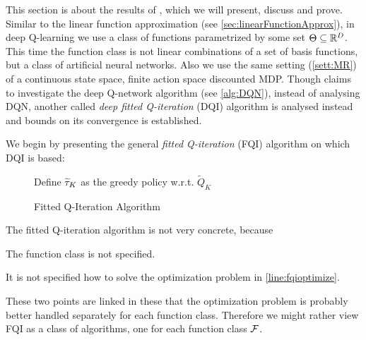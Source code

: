 This section is about the results of ,
which we will present, discuss and prove.
Similar to the linear function approximation
(see \cref{sec:linearFunctionApprox}), in deep Q-learning
we use a class of functions parametrized by some set $\Theta \subseteq \mathbb{R}^D$.
This time the function class is not linear combinations of a set of
basis functions, but a class of artificial neural networks.
Also we use the same setting (\cref{sett:MR}) of a
continuous state space, finite action space discounted MDP.
Though  claims to investigate the deep Q-network algorithm
(see \cref{alg:DQN}),
instead of analysing DQN,
another called \emph{deep fitted Q-iteration} (DQI) algorithm is
analysed instead and bounds on its convergence is established.

We begin by presenting the general \emph{fitted Q-iteration} (FQI) algorithm
on which DQI is based:
\begin{figure}[H]
\begin{algorithm}[H] %
  \caption{Fitted Q-Iteration Algorithm}
  Define $\widetilde{\tau}_K$ as the greedy policy w.r.t. $\widetilde{Q}_K$ \\
  \label{alg:fqi}
\end{algorithm}
\end{figure}
\begin{rem}
  The fitted Q-iteration algorithm is not very concrete, because
  \begin{enumerate*}[label=(\arabic*.)]
    \item The function class is not specified.
    \item It is not specified how to solve the optimization problem
      in \cref{line:fqioptimize}.
  \end{enumerate*}
  These two points are linked in these that the optimization problem
  is probably better handled separately for each function class.
  Therefore we might rather view FQI
  as a class of algorithms, one for each function class $\mathcal{F}$.
\end{rem}

